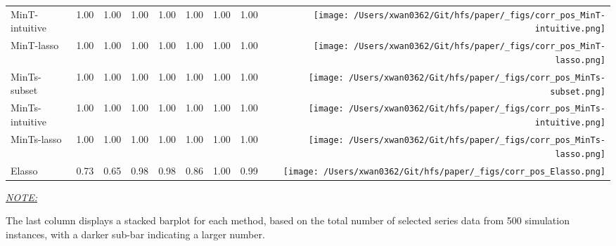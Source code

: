 \documentclass[11pt,a4paper,]{article}
\begin{document}
\begin{table}[!h]
{\begin{threeparttable}
\begin{tabular}{llrrrrrr>{}r}
MinT-intuitive & 1.00 & 1.00 & 1.00 & 1.00 & 1.00 & 1.00 & 1.00 & \texttt{[image: /Users/xwan0362/Git/hfs/paper/\_figs/corr\_pos\_MinT-intuitive.png]}\\
MinT-lasso & 1.00 & 1.00 & 1.00 & 1.00 & 1.00 & 1.00 & 1.00 & \texttt{[image: /Users/xwan0362/Git/hfs/paper/\_figs/corr\_pos\_MinT-lasso.png]}\\
\midrule
MinTs-subset & 1.00 & 1.00 & 1.00 & 1.00 & 1.00 & 1.00 & 1.00 & \texttt{[image: /Users/xwan0362/Git/hfs/paper/\_figs/corr\_pos\_MinTs-subset.png]}\\
MinTs-intuitive & 1.00 & 1.00 & 1.00 & 1.00 & 1.00 & 1.00 & 1.00 & \texttt{[image: /Users/xwan0362/Git/hfs/paper/\_figs/corr\_pos\_MinTs-intuitive.png]}\\
MinTs-lasso & 1.00 & 1.00 & 1.00 & 1.00 & 1.00 & 1.00 & 1.00 & \texttt{[image: /Users/xwan0362/Git/hfs/paper/\_figs/corr\_pos\_MinTs-lasso.png]}\\
\midrule
Elasso & 0.73 & 0.65 & 0.98 & 0.98 & 0.86 & 1.00 & 0.99 & \texttt{[image: /Users/xwan0362/Git/hfs/paper/\_figs/corr\_pos\_Elasso.png]}\\
\bottomrule
\end{tabular}
\begin{tablenotes}[para]
\item \underline{\textit{NOTE:}} 
\item The last column displays a stacked barplot for each method, based on the total number of selected series data from 500 simulation instances, with a darker sub-bar indicating a larger number.
\end{tablenotes}
\end{threeparttable}}
\endgroup{}
\end{table}
\end{document}
